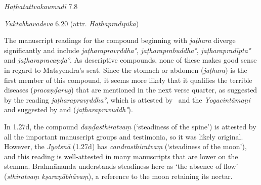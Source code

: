 \begin{ekdosis}
\begin{testimonia}[hp01_027]
\emph{Haṭhatattvakaumudī} 7.8

\begin{versinnote}
\end{versinnote}

\emph{Yuktabhavadeva} 6.20 (attr. \emph{Haṭhapradīpikā})

\begin{versinnote}
\end{versinnote}

\end{testimonia}

\begin{philcomm}[hp01_027]
The manuscript readings for the compound beginning with \emph{jaṭhara} diverge significantly and include \emph{jaṭharapravṛddha°}, \emph{jaṭharaprabuddha°}, \emph{jaṭharapradīpta°} and \emph{jaṭharapracaṇḍa°}. As descriptive compounds, none of these makes good sense in regard to Matsyendra's seat. Since the stomach or abdomen (\emph{jaṭhara}) is the first member of this compound, it seems more likely that it qualifies the terrible diseases (\emph{pracaṇḍarug}) that are mentioned in the next verse quarter, as suggested by the reading \emph{jaṭharapravṛddha°}, which is attested by \etaTwo\ and the \textit{Yogacintāmaṇi} and suggested by \gammaOne and \deltaOne (\emph{jaṭharapravuddh°}).

In 1.27d, the compound \emph{daṇḍasthiratvaṃ} (`steadiness of the spine') is attested by all the important manuscript groups and testimonia, so it was likely original. However, the \emph{Jyotsnā} (1.27d) has \emph{candrasthiratvaṃ} (`steadiness of the moon'), and this reading is well-attested in many manuscripts that are lower on the stemma. Brahmānanda understands steadiness here as `the absence of flow' (\emph{sthiratvaṃ kṣaraṇābhāvaṃ}), a reference to the moon retaining its nectar.
\end{philcomm}


\end{ekdosis}
